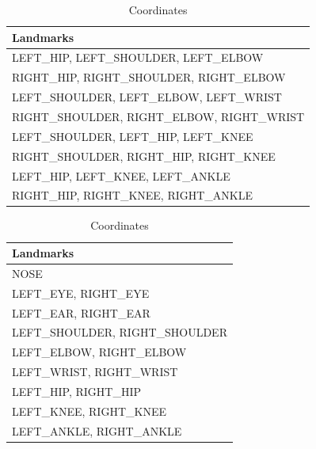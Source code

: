 \documentclass[conference,onecolumn,oneside]{IEEEtran}
\begin{document}
\begin{table}[h]
\centering
\begin{minipage}{0.48\textwidth}
    \centering
    \caption{Angles}
    \begin{tabular}{|l|}
    \hline
    \textbf{Landmarks} \\
    \hline
    LEFT\_HIP, LEFT\_SHOULDER, LEFT\_ELBOW \\
    \hline
    RIGHT\_HIP, RIGHT\_SHOULDER, RIGHT\_ELBOW \\
    \hline
    LEFT\_SHOULDER, LEFT\_ELBOW, LEFT\_WRIST \\
    \hline
    RIGHT\_SHOULDER, RIGHT\_ELBOW, RIGHT\_WRIST \\
    \hline
    LEFT\_SHOULDER, LEFT\_HIP, LEFT\_KNEE \\
    \hline
    RIGHT\_SHOULDER, RIGHT\_HIP, RIGHT\_KNEE \\
    \hline
    LEFT\_HIP, LEFT\_KNEE, LEFT\_ANKLE \\
    \hline
    RIGHT\_HIP, RIGHT\_KNEE, RIGHT\_ANKLE \\
    \hline
    \end{tabular}
    \label{tab:angles}
\end{minipage}
\hfill
\begin{minipage}{0.48\textwidth}
    \centering
    \caption{Coordinates}
    \begin{tabular}{|l|}
    \hline
    \textbf{Landmarks} \\
    \hline
    NOSE \\
    \hline
    LEFT\_EYE, RIGHT\_EYE \\
    \hline
    LEFT\_EAR, RIGHT\_EAR \\
    \hline
    LEFT\_SHOULDER, RIGHT\_SHOULDER \\
    \hline
    LEFT\_ELBOW, RIGHT\_ELBOW \\
    \hline
    LEFT\_WRIST, RIGHT\_WRIST \\
    \hline
    LEFT\_HIP, RIGHT\_HIP \\
    \hline
    LEFT\_KNEE, RIGHT\_KNEE \\
    \hline
    LEFT\_ANKLE, RIGHT\_ANKLE \\
    \hline
    \end{tabular}
    \label{tab:coordinates}
\end{minipage}
\end{table}

\vspace{0.5cm}
\end{document}
